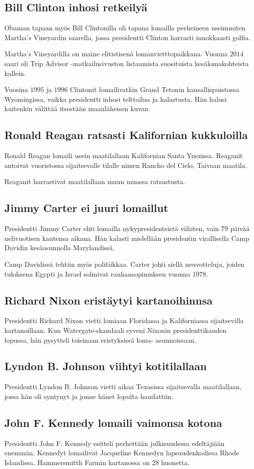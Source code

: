 \documentclass[a4paper,11pt]{article}
\begin{document}
  \subsection{Bill Clinton inhosi retkeilyä}
  Obaman tapaan myös Bill Clintonilla oli tapana lomailla
  perheineen useimmiten Martha's Vineyardin saarella, jossa
  presidentti Clinton harrasti innokkaasti golfia.
  \par
  Martha's Vineyardilla on maine elitistisenä
  lomanvietttopaikkana. Vuonna $2014$ saari oli Trip Advisor%
  -matkailusivuston listaamista suosituista kesälomakohteista
  kallein.
  \par
  Vuosina $1995$ ja $1996$ Clintonit lomailivatkin Grand
  Tetonin kansallispuistossa Wyomingissa, vaikka presidentti
  inhosi telttailua ja kalastusta. Hän halusi kuitenkin
  välittää itsestään maanläheisen kuvan.
  \subsection{Ronald Reagan ratsasti Kalifornian
  kukkuloilla}
  Ronald Reagan lomaili usein maatilallaan Kalifornian Santa
  Ynezissa. Reaganit antoivat vuoristossa sijaitsevalle tilalle
  nimen Rancho del Cielo, Taivaan maatila.
  \par
  Reaganit harrastivat maatilallaan muun muassa ratsastusta.
  \subsection{Jimmy Carter ei juuri lomaillut}
  Presidentti Jimmy Carter ehti lomailla nykypresidenteistä
  vähiten, vain $79$ päivää nelivuotisen kautensa aikana.
  Hän kalasti mielellään presidentin virallisella Camp
  Davidin kesäasunnolla Marylandissä.
  \par
  Camp Davidissä tehtiin myös politiikkaa. Carter johti
  siellä neuvotteluja, joiden tuloksena Egypti ja Israel
  solmivat rauhansopimuksen vuonna $1978$.
  \subsection{Richard Nixon eristäytyi kartanoihinnsa}
  Presidentti Richard Nixon vietti lomiaan Floridassa
  ja Kaliforniassa sijaitsevilla kartanoillaan. Kun
  Watergate-skandaali syveni Nixonin presidenttikauden
  lopussa, hän pysytteli toisinaan eristyksissä loma-%
  asunnoissaan.
  \subsection{Lyndon B. Johnson viihtyi
  kotitilallaan}
  Presidentti Lyndon B. Johnson vietti aikaa Texasissa
  sijaitsevalla maatilallaan, jossa hän oli syntynyt
  ja jonne hänet lopulta haudattiin.
  \subsection{John F. Kennedy lomaili vaimonsa kotona}
  Presidentti John F. Kennedy esitteli perhettään julkisuudessa
  edeltäjiään enemmän. Kennedyt lomailivat Jacqueline
  Kennedyn lapsuudenkodissa Rhode Islandissa.
  Hammersmitth Farmin kartanossa on 28 huonetta.
\end{document}
